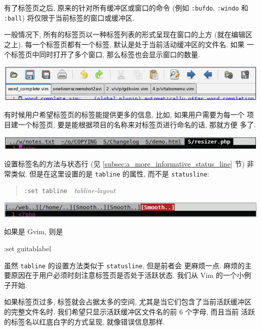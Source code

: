 有了标签页之后, 原来的针对所有缓冲区或窗口的命令 (例如 \texttt{:bufdo},
\texttt{:windo} 和 \texttt{:ball}) 将仅限于当前标签的窗口或缓冲区.

一般情况下, 所有的标签页以一种标签列表的形式呈现在窗口的上方 (就在编辑区
之上). 每一个标签页都有一个标签, 默认是处于当前活动缓冲区的文件名. 如果 
一个标签页中同时打开了多个窗口, 那么标签也会显示窗口的数量.
\begin{center}
\includegraphics[scale=0.48]{./images/page33.png}
\end{center}
有时候用户希望标签页的标签能提供更多的信息, 比如, 如果用户需要为每一个
项目建一个标签页, 要是能根据项目的名称来对标签页进行命名的话, 那就方便
多了.
\begin{center}
\includegraphics[scale=0.48]{./images/page34-1.png}
\end{center}
设置标签名的方法与状态行 (见 \ref{subsec:a_more_informative_status_line} 节)
非常类似. 但是在这里设置的是 \texttt{tabline} 的属性, 而不是
\texttt{statusline}:
\begin{quotation}
\texttt{:set tabline}\ \ \textit{tabline-layout}
\end{quotation}
\begin{center}
\includegraphics[scale=0.48]{./images/page34-2.png}
\end{center}
如果是 Gvim, 则是
\begin{vimcmd}
:set guitablabel
\end{vimcmd}

虽然 \texttt{tabline} 的设置方法类似于 \texttt{statusline}, 但是前者会
更麻烦一点. 麻烦的主要原因在于用户必须时刻注意标签页是否处于活跃状态.
我们从 Vim 的一个小例子开始.

如果标签页过多, 标签就会占据太多的空间, 尤其是当它们包含了当前活跃缓冲区
的完整文件名时. 我们希望只显示活跃缓冲区文件名的前 6 个字母, 而且当前
活跃的标签名以红底白字的方式呈现, 就像错误信息那样.

